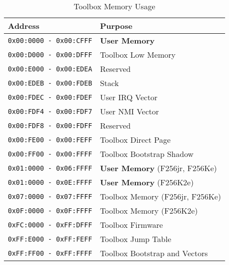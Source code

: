 \begin{table}
	\begin{center}
		\begin{tabular}{|l|l|} \hline
			Address & Purpose \\ \hline\hline
			{\tt 0x00:0000 - 0x00:CFFF} & {\bf User Memory} \\ \hline
			{\tt 0x00:D000 - 0x00:DFFF} & Toolbox Low Memory \\ \hline
			{\tt 0x00:E000 - 0x00:EDEA} & Reserved \\ \hline
			{\tt 0x00:EDEB - 0x00:FDEB} & Stack \\ \hline
			{\tt 0x00:FDEC - 0x00:FDEF} & User IRQ Vector \\ \hline
			{\tt 0x00:FDF4 - 0x00:FDF7} & User NMI Vector \\ \hline
			{\tt 0x00:FDF8 - 0x00:FDFF} & Reserved \\ \hline
			{\tt 0x00:FE00 - 0x00:FEFF} & Toolbox Direct Page \\ \hline
			{\tt 0x00:FF00 - 0x00:FFFF} & Toolbox Bootstrap Shadow \\ \hline
			{\tt 0x01:0000 - 0x06:FFFF} & {\bf User Memory} (F256jr, F256Ke) \\ \hline	
			{\tt 0x01:0000 - 0x0E:FFFF} & {\bf User Memory} (F256K2e) \\ \hline	
			{\tt 0x07:0000 - 0x07:FFFF} & Toolbox Memory (F256jr, F256Ke) \\ \hline
			{\tt 0x0F:0000 - 0x0F:FFFF} & Toolbox Memory (F256K2e) \\ \hline
			{\tt 0xFC:0000 - 0xFF:DFFF} & Toolbox Firmware \\ \hline
			{\tt 0xFF:E000 - 0xFF:FEFF} & Toolbox Jump Table \\ \hline
			{\tt 0xFF:FF00 - 0xFF:FFFF} & Toolbox Bootstrap and Vectors \\ \hline
		\end{tabular}
	\end{center}
	\caption{Toolbox Memory Usage}
	\label{tbl:memory_map}
\end{table}